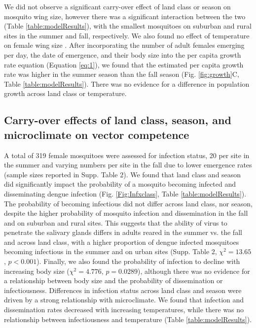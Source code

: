 \documentclass[12pt]{article}
\begin{document}
We did not observe a significant carry-over effect of land class or season on mosquito wing size, however there was a significant interaction between the two (Table \ref{table:modelResults}), with the smallest mosquitoes on suburban and rural sites in the summer and fall, respectively. We also found no effect of temperature on female wing size . After incorporating the number of adult females emerging per day, the date of emergence, and their body size into the per capita growth rate equation (Equation \ref{eq:1}), we found that the estimated per capita growth rate was higher in the summer season than the fall season (Fig. \ref{fig:growth}C, Table \ref{table:modelResults}). There was no evidence for a difference in population growth across land class or temperature.

\subsection{Carry-over effects of land class, season, and microclimate on vector competence}

A total of 319 female mosquitoes were assessed for infection status, 20 per site in the summer and varying numbers per site in the fall due to lower emergence rates (sample sizes reported in Supp. Table 2). We found that land class and season did significantly impact the probability of a mosquito becoming infected and disseminating dengue infection (Fig. \ref{Fig:Infxclass}, Table \ref{table:modelResults}). The probability of becoming infectious did not differ across land class, nor season, despite the higher probability of mosquito infection and dissemination in the fall and on suburban and rural sites. This suggests that the ability of virus to penetrate the salivary glands differs in adults reared in the summer vs. the fall and across land class, with a higher proportion of dengue infected mosquitoes becoming infectious in the summer and on urban sites (Supp. Table 2, $\chi^2=13.65$, $p<0.001$). Finally, we also found the probability of infection to decline with increasing body size ($\chi^2=4.776$, $p=0.0289$), although there was no evidence for a relationship between body size and the probability of dissemination or infectiousness. Differences in infection status across land class and season were driven by a strong relationship with microclimate. We found that infection and dissemination rates decreased with increasing temperatures, while there was no relationship between infectiousness and temperature (Table \ref{table:modelResults}).
\end{document}
